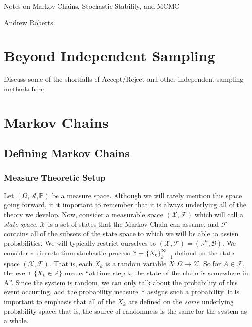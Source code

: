 \documentclass[12pt]{article}
\newcommand{\R}{\mathcal{R}}
\newcommand{\Prob}{\mathbb{P}}
\def\R{\mathbb{R}}
\begin{document}
\begin{center}
\Large
Notes on Markov Chains, Stochastic Stability, and MCMC
\end{center}

\begin{flushright}
Andrew Roberts
\end{flushright} 

\section{Beyond Independent Sampling}
Discuss some of the shortfalls of Accept/Reject and other independent sampling methods here. 

\section{Markov Chains}
\subsection{Defining Markov Chains}
\subsubsection{Measure Theoretic Setup}
Let $(\Omega, \mathcal{A}, \Prob)$ be a measure space. Although we will rarely mention this space going forward, it it important to remember that it is always
underlying all of the theory we develop. Now, consider a measurable space $(\mathcal{X}, \mathcal{F})$ which will call a \textit{state space}. $\mathcal{X}$ is a set of states that the Markov 
Chain can assume, and $\mathcal{F}$ contains all of the subsets of the state space to which we will be able to assign probabilities. We will typically restrict ourselves to 
$(\mathcal{X}, \mathcal{F}) = (\R^n, \mathcal{B})$.
We consider a discrete-time stochastic process $\mathbb{X} = \{X_k\}_{k = 1}^{\infty}$ defined on the state space $(\mathcal{X}, \mathcal{F})$. That is, each $X_k$ is a random variable
$X: \Omega \to \mathcal{X}$. So for $A \in \mathcal{F}$, the event $\{X_k \in A\}$ means ``at time step k, the state of the chain is somewhere in A''. Since the system is random, we 
can only talk about the probability of this event occurring, and the probability measure $\Prob$ assigns such a probability. It is important to emphasis that all of the $X_k$ are defined on 
the \textit{same} underlying probability space; that is, the source of randomness is the same for the system as a whole.
\end{document}
